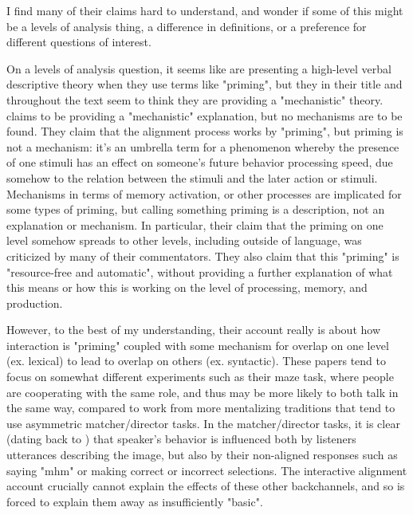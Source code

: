 \documentclass[]{article}
\begin{document}

I find many of their claims hard to understand, and wonder if some of this might be a levels of analysis thing, a difference in definitions, or a preference for different questions of interest. 

On a levels of analysis question, it seems like \cite{pickering2004} are presenting a high-level verbal descriptive theory when they use terms like "priming", but they in their title and throughout the text seem to think they are providing a "mechanistic" theory. \cite{pickering2004} claims to be providing a "mechanistic" explanation, but no mechanisms are to be found. They claim that the alignment process works by "priming", but priming is not a mechanism: it's an umbrella term for a phenomenon whereby the presence of one stimuli has an effect on someone's future behavior processing speed, due somehow to the relation between the stimuli and the later action or stimuli. Mechanisms in terms of memory activation, or other processes are implicated for some types of priming, but calling something priming is a description, not an explanation or mechanism. In particular, their claim that the priming on one level somehow spreads to other levels, including outside of language, was criticized by many of their commentators. They also claim that this "priming" is "resource-free and automatic", without providing a further explanation of what this means or how this is working on the level of processing, memory, and production. 

However, to the best of my understanding, their account really is about how interaction is "priming" coupled with some mechanism for overlap on one level (ex. lexical) to lead to overlap on others (ex. syntactic). These papers tend to focus on somewhat different experiments such as their maze task, where people are cooperating with the same role, and thus may be more likely to both talk in the same way, compared to work from more mentalizing traditions that tend to use asymmetric matcher/director tasks. In the matcher/director tasks, it is clear (dating back to \cite{krauss1966}) that speaker's behavior is influenced both by listeners utterances describing the image, but also by their non-aligned responses such as saying "mhm" or making correct or incorrect selections. The interactive alignment account crucially cannot explain the effects of these other backchannels, and so is forced to explain them away as insufficiently "basic". 
\end{document}
